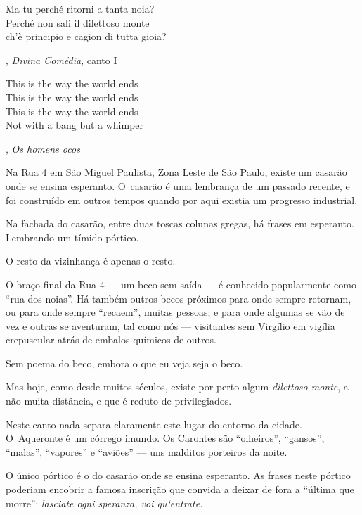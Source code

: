  

\epigraph{Ma tu perché ritorni a tanta noia?\\ Perché non sali il dilettoso
monte\\ ch'è principio e cagion di tutta gioia?}{, \textit{Divina Comédia}, canto I} 



\epigraph{This is the way the world ends\\ This is the way the world ends\\ This
is the way the world ends\\ Not with a bang but a whimper}{, \textit{Os homens ocos}} 

 


Na Rua 4 em São Miguel Paulista, Zona Leste de São Paulo, existe um
casarão onde se ensina esperanto. O~casarão é uma lembrança de um
passado recente, e foi construído em outros tempos quando por aqui
existia um progresso industrial.

Na fachada do casarão, entre duas toscas colunas gregas, há frases em
esperanto. Lembrando um tímido pórtico.

O resto da vizinhança é apenas o resto.

\asterisc{}

O braço final da Rua 4 --- um beco sem saída --- é conhecido
popularmente como ``rua dos noias''. Há também outros becos próximos
para onde sempre retornam, ou para onde sempre ``recaem'', muitas
pessoas; e para onde algumas se vão de vez e outras se aventuram, tal
como nós --- visitantes sem Virgílio em vigília crepuscular atrás de
embalos químicos de outros.

Sem poema do beco, embora o que eu veja seja o beco.

Mas hoje, como desde muitos séculos, existe por perto algum
\emph{dilettoso monte}, a não muita distância, e que é reduto de
privilegiados.

\asterisc{}

Neste canto nada separa claramente este lugar do entorno da cidade. O~Aqueronte é um córrego imundo. Os Carontes são ``olheiros'', ``gansos'',
``malas'', ``vapores'' e ``aviões'' --- uns malditos porteiros da noite.

O único pórtico é o do casarão onde se ensina esperanto. As frases neste
pórtico poderiam encobrir a famosa inscrição que convida a deixar de
fora a ``última que morre'': \emph{lasciate ogni speranza, voi
qu`entrate.}

